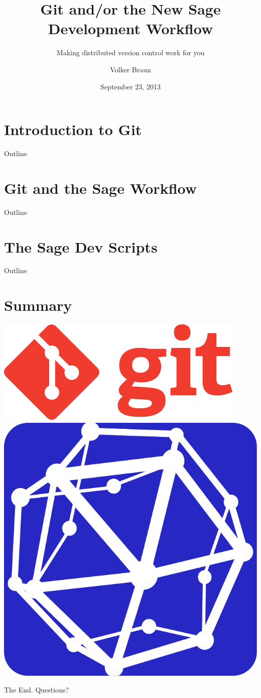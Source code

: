 \documentclass[11pt]{beamer}
\author{Volker Braun}
\title{Git and/or the New Sage Development Workflow}
\subtitle{Making distributed version control work for you}
\institute{Oxford University}
\date{September 23, 2013}
\begin{document}
\begin{frame}[plain]
	\titlepage
\end{frame}

\section{Introduction to Git}
\begin{frame}{Outline}
	\tableofcontents
\end{frame}









\section{Git and the Sage Workflow}
\begin{frame}{Outline}
	\tableofcontents
\end{frame}





\section{The Sage Dev Scripts}
\begin{frame}{Outline}
	\tableofcontents
\end{frame}





\section{Summary}

\begin{frame}
  \includegraphics[width=0.6\linewidth]{images/git_logo}
  \hfill
  \includegraphics[width=0.3\linewidth]{images/sagemath_icon}
  \hfill
  \vspace{1cm}

  \begin{center}
    \Huge
    The End. Questions?
  \end{center}
\end{frame}
\end{document}
